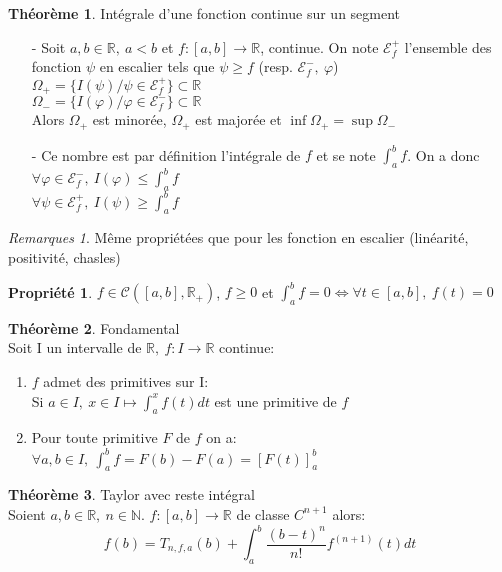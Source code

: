 \documentclass[fleqn]{article}
\theoremstyle{definition} \newtheorem*{defi}{D\'efinition}
\theoremstyle{definition} \newtheorem*{theo}{Th\'eor\`eme}
\theoremstyle{definition} \newtheorem*{coro}{Corollaire}
\theoremstyle{remark} \newtheorem*{rqs}{Remarques}
\theoremstyle{definition} \newtheorem*{prop}{Propri\'et\'e}
\begin{document}
\begin{theo} Int\'egrale d'une fonction continue sur un segment
	\begin{itemize}
		\item [-] Soit $a,b \in \mathbb{R},\ a<b$ et $f:[a,b] \rightarrow \mathbb{R}$, continue. On note $\mathcal{E}_f^+$ l'ensemble des
		fonction $\psi$
			en escalier tels que $\psi \geq f$ (resp. $\mathcal{E}_f^-,\ \varphi$) \\
			$\Omega_+ = \{I(\psi) / \psi \in \mathcal{E}_f^+\} \subset \mathbb{R}$ \\
			$\Omega_- = \{I(\varphi) / \varphi \in \mathcal{E}_f^-\} \subset \mathbb{R}$ \\
			Alors $\Omega_+$ est minor\'ee, $\Omega_+$ est major\'ee et $\inf \Omega_+ = \sup \Omega_-$
		\item [-] Ce nombre est par d\'efinition l'int\'egrale de $f$ et se note $\int_a^b f$. On a donc\\
			$\forall \varphi \in \mathcal{E}_f^-,\ I(\varphi) \leq \int_a^b f$\\
			$\forall \psi \in \mathcal{E}_f^+,\ I(\psi) \geq \int_a^b f$
	\end{itemize}
\end{theo}

\begin{rqs} M\^eme propri\'et\'ees que pour les fonction en escalier (lin\'earit\'e, positivit\'e, chasles)
\end{rqs}

\begin{prop} $f \in \mathscr{C}([a,b], \mathbb{R}_+)$, $f \geq 0$ et $\int_a^b f = 0 \Leftrightarrow \forall t \in [a,b],\ f(t) = 0$
\end{prop}

\begin{theo} Fondamental \\
	Soit I un intervalle de $\mathbb{R},\ f:I\rightarrow \mathbb{R}$ continue:
	\begin{enumerate}
		\item $f$ admet des primitives sur I: \\
			Si $a \in I,\ x \in I \mapsto \int_a^x f(t)dt$ est une primitive de $f$
		\item Pour toute primitive $F$ de $f$ on a: \\
			$\forall a,b \in I,\ \int_a^b f = F(b) - F(a) = [F(t)]_a^b$
	\end{enumerate}
\end{theo}

\begin{theo} Taylor avec reste int\'egral \\
	Soient $a,b \in \mathbb{R},\ n \in \mathbb{N}$. $f:[a,b] \rightarrow \mathbb{R}$ de classe $C^{n+1}$ alors:
	\[f(b) = T_{n,f,a}(b) + \int_a^b \frac{(b-t)^n}{n!} f^{(n+1)} (t)dt\]
\end{theo}
\end{document}
